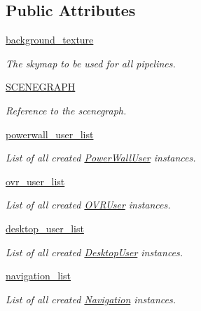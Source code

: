 \subsection*{\-Public \-Attributes}
\begin{DoxyCompactItemize}
\item 
\hyperlink{classlib_1_1ViewingManager_1_1ViewingManager_a558b079ffef42dcc6db93b1813b10a80}{background\-\_\-texture}
\begin{DoxyCompactList}\small\item\em \-The skymap to be used for all pipelines. \end{DoxyCompactList}\item 
\hyperlink{classlib_1_1ViewingManager_1_1ViewingManager_aa5997fa80391497f2864aecc007e53e9}{\-S\-C\-E\-N\-E\-G\-R\-A\-P\-H}
\begin{DoxyCompactList}\small\item\em \-Reference to the scenegraph. \end{DoxyCompactList}\item 
\hyperlink{classlib_1_1ViewingManager_1_1ViewingManager_add9325869ce96e7627f14c9bc3fc4e9f}{powerwall\-\_\-user\-\_\-list}
\begin{DoxyCompactList}\small\item\em \-List of all created \hyperlink{namespacelib_1_1PowerWallUser}{\-Power\-Wall\-User} instances. \end{DoxyCompactList}\item 
\hyperlink{classlib_1_1ViewingManager_1_1ViewingManager_ad01ea0377a48901a81988c7759c74e79}{ovr\-\_\-user\-\_\-list}
\begin{DoxyCompactList}\small\item\em \-List of all created \hyperlink{namespacelib_1_1OVRUser}{\-O\-V\-R\-User} instances. \end{DoxyCompactList}\item 
\hyperlink{classlib_1_1ViewingManager_1_1ViewingManager_a4343557ee71def1cfc14c3a076dc01a4}{desktop\-\_\-user\-\_\-list}
\begin{DoxyCompactList}\small\item\em \-List of all created \hyperlink{namespacelib_1_1DesktopUser}{\-Desktop\-User} instances. \end{DoxyCompactList}\item 
\hyperlink{classlib_1_1ViewingManager_1_1ViewingManager_ae0f2473d3e98f65330d3e495230a32b2}{navigation\-\_\-list}
\begin{DoxyCompactList}\small\item\em \-List of all created \hyperlink{namespacelib_1_1Navigation}{\-Navigation} instances. \end{DoxyCompactList}\item 

\end{DoxyCompactItemize}
